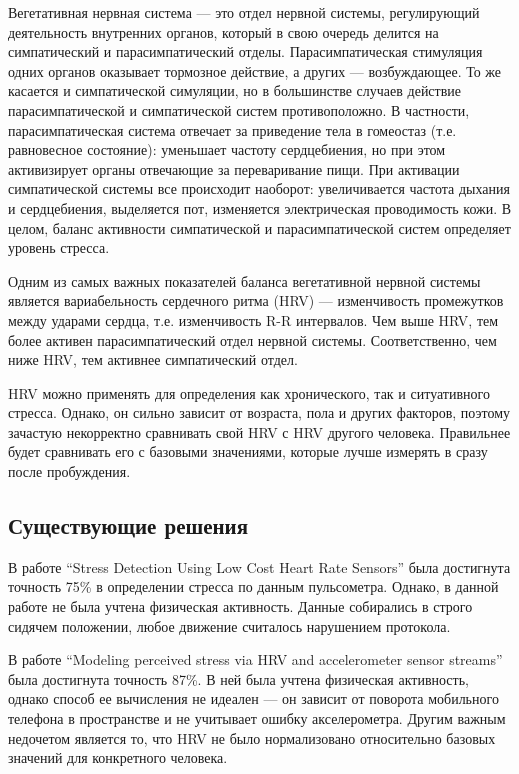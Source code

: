 \documentclass[14pt]{matmex-diploma-custom}
\begin{document}
Вегетативная нервная система — это отдел нервной системы, регулирующий
деятельность внутренних органов, который в свою очередь делится на симпатический
и парасимпатический отделы. Парасимпатическая стимуляция одних органов оказывает
тормозное действие, а других — возбуждающее. То же касается и симпатической
симуляции, но в большинстве случаев действие парасимпатической и симпатической
систем противоположно. В частности, парасимпатическая система отвечает за
приведение тела в гомеостаз (т.е. равновесное состояние): уменьшает частоту
сердцебиения, но при этом активизирует органы отвечающие за переваривание пищи.
При активации симпатической системы все происходит наоборот: увеличивается
частота дыхания и сердцебиения, выделяется пот, изменяется электрическая
проводимость кожи. В целом, баланс активности симпатической и парасимпатической
систем определяет уровень стресса.

Одним из самых важных показателей баланса вегетативной нервной системы является
вариабельность сердечного ритма (HRV) — изменчивость промежутков между ударами
сердца, т.е. изменчивость R-R интервалов. Чем выше HRV, тем более активен
парасимпатический отдел нервной системы. Соответственно, чем ниже HRV, тем
активнее симпатический отдел.

HRV можно применять для определения как хронического, так и ситуативного
стресса. Однако, он сильно зависит от возраста, пола и других факторов, поэтому
зачастую некорректно сравнивать свой HRV с HRV другого человека. Правильнее
будет сравнивать его с базовыми значениями, которые лучше измерять в сразу после
пробуждения.

\subsection{Существующие решения}

В работе ``Stress Detection Using Low Cost Heart Rate Sensors''
\cite{article:cheap_hrm} была достигнута точность 75\% в определении стресса по
данным пульсометра. Однако, в данной работе не была учтена физическая
активность. Данные собирались в строго сидячем положении, любое движение
считалось нарушением протокола.

В работе ``Modeling perceived stress via HRV and accelerometer sensor streams''
\cite{article:accelerometer_hrv} была достигнута точность 87\%. В ней была
учтена физическая активность, однако способ ее вычисления не идеален --- он
зависит от поворота мобильного телефона в пространстве и не учитывает ошибку
акселерометра. Другим важным недочетом является то, что HRV не было
нормализовано относительно базовых значений для конкретного человека.
\end{document}
